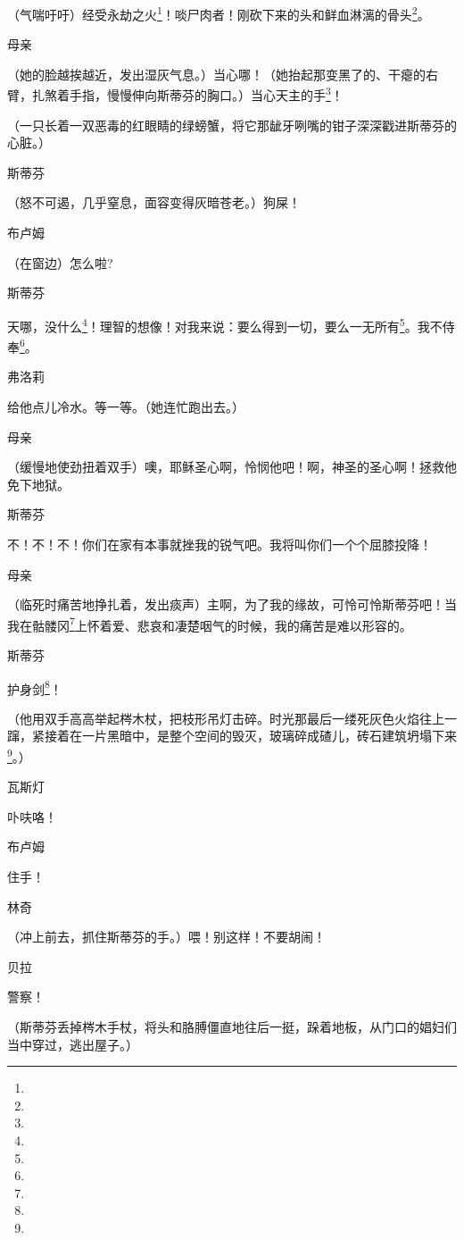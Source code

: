 \par （气喘吁吁）经受永劫之火\footnote{}！啖尸肉者！刚砍下来的头和鲜血淋漓的骨头\footnote{}。
\par 母亲
\par （她的脸越挨越近，发出湿灰气息。）当心哪！（她抬起那变黑了的、干瘪的右臂，扎煞着手指，慢慢伸向斯蒂芬的胸口。）当心天主的手\footnote{}！
\par （一只长着一双恶毒的红眼睛的绿螃蟹，将它那龇牙咧嘴的钳子深深戳进斯蒂芬的心脏。）
\par 斯蒂芬
\par （怒不可遏，几乎窒息，面容变得灰暗苍老。）狗屎！
\par 布卢姆
\par （在窗边）怎么啦?
\par 斯蒂芬
\par 天哪，没什么\footnote{}！理智的想像！对我来说：要么得到一切，要么一无所有\footnote{}。我不侍奉\footnote{}。
\par 弗洛莉
\par 给他点儿冷水。等一等。（她连忙跑出去。）
\par 母亲
\par （缓慢地使劲扭着双手）噢，耶稣圣心啊，怜悯他吧！啊，神圣的圣心啊！拯救他免下地狱。
\par 斯蒂芬
\par 不！不！不！你们在家有本事就挫我的锐气吧。我将叫你们一个个屈膝投降！
\par 母亲
\par （临死时痛苦地挣扎着，发出痰声）主啊，为了我的缘故，可怜可怜斯蒂芬吧！当我在骷髅冈\footnote{}上怀着爱、悲哀和凄楚咽气的时候，我的痛苦是难以形容的。
\par 斯蒂芬
\par 护身剑\footnote{}！
\par （他用双手高高举起梣木杖，把枝形吊灯击碎。时光那最后一缕死灰色火焰往上一蹿，紧接着在一片黑暗中，是整个空间的毁灭，玻璃碎成碴儿，砖石建筑坍塌下来\footnote{}。）
\par 瓦斯灯
\par 卟呋咯！
\par 布卢姆
\par 住手！
\par 林奇
\par （冲上前去，抓住斯蒂芬的手。）喂！别这样！不要胡闹！
\par 贝拉
\par 警察！
\par （斯蒂芬丢掉梣木手杖，将头和胳膊僵直地往后一挺，跺着地板，从门口的娼妇们当中穿过，逃出屋子。）
